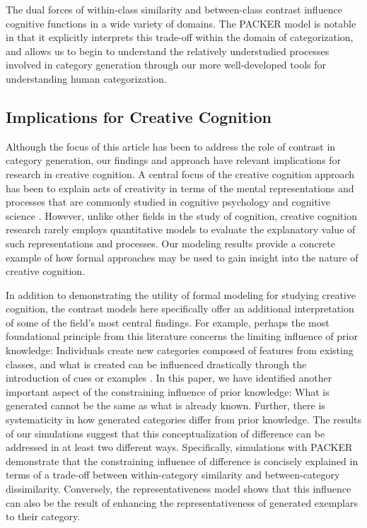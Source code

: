 \documentclass[pdflatex,sn-apa]{sn-jnl}%
\theoremstyle{thmstyleone}%
\theoremstyle{thmstyletwo}%
\theoremstyle{thmstylethree}%
\begin{document}
The dual forces of within-class similarity and between-class contrast influence
cognitive functions in a wide variety of domains. The PACKER model is notable in
that it explicitly interprets this trade-off within the domain of
categorization, and allows us to begin to understand the relatively understudied
processes involved in category generation through our more well-developed tools
for understanding human categorization.

\subsection{Implications for Creative Cognition}

Although the focus of this article has been to address the role of contrast in category generation, our findings and approach have relevant implications
for research in creative cognition. A central focus of the creative cognition
approach has been to explain acts of creativity in terms of the mental
representations and processes that are commonly studied in cognitive psychology
and cognitive science \citep{finke1992creative,smith1995creative}. However,
unlike other fields in the study of cognition, creative cognition research
rarely employs quantitative models to evaluate the explanatory value of such
representations and processes. Our modeling results provide a concrete example
of how formal approaches may be used to gain insight into the nature of creative
cognition.

In addition to demonstrating the utility of formal modeling for studying
creative cognition, the contrast models here specifically offer an additional
interpretation of some of the field's most central findings. For example,
perhaps the most foundational principle from this literature concerns the
limiting influence of prior knowledge: Individuals create new categories
composed of features from existing classes, and what is created can be
influenced drastically through the introduction of cues or examples
\citep{marsh1999inadvertent,smith1993constraining}. In this paper, we have
identified another important aspect of the constraining influence of prior
knowledge: What is generated cannot be the same as what is already known.
Further, there is systematicity in how generated categories differ from prior
knowledge. The results of our simulations suggest that this conceptualization of
difference can be addressed in at least two different ways. Specifically,
simulations with PACKER demonstrate that the constraining influence of
difference is concisely explained in terms of a trade-off between
within-category similarity and between-category dissimilarity. Conversely, the
representativeness model shows that this influence can also be the result of
enhancing the representativeness of generated exemplars to their category.
\end{document}
